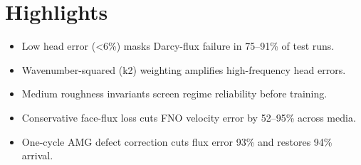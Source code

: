 \documentclass[12pt]{article}
\begin{document}
\section*{Highlights}

\begin{itemize}
  \item Low head error (<6\%) masks Darcy-flux failure in 75--91\% of test runs.
  \item Wavenumber-squared (k2) weighting amplifies high-frequency head errors.
  \item Medium roughness invariants screen regime reliability before training.
  \item Conservative face-flux loss cuts FNO velocity error by 52--95\% across media.
  \item One-cycle AMG defect correction cuts flux error 93\% and restores 94\% arrival.
\end{itemize}
\end{document}
